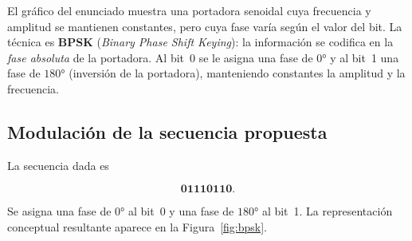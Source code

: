 ﻿\documentclass[12pt,a4paper]{article}
\begin{document}
El gráfico del enunciado muestra una portadora senoidal cuya frecuencia y
amplitud se mantienen constantes, pero cuya fase varía según el valor del bit.
La técnica es \textbf{BPSK} (\emph{Binary Phase Shift Keying}): la información
se codifica en la \emph{fase absoluta} de la portadora. Al bit~0 se le asigna
una fase de $0°$ y al bit~1 una fase de $180°$ (inversión de la portadora),
manteniendo constantes la amplitud y la frecuencia.

\subsection{Modulación de la secuencia propuesta}

La secuencia dada es

\[
\mathbf{01110110}.
\]

Se asigna una fase de $0°$ al bit~0 y una fase de $180°$ al bit~1. La
representación conceptual resultante aparece en la Figura~\ref{fig:bpsk}.
\end{document}
